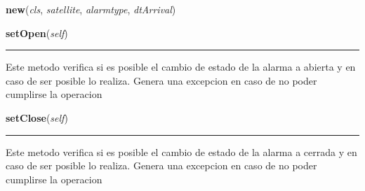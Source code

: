     \label{GroundSegment:models:Alarms:Alarm:Alarm:new}

    \vspace{0.5ex}

\hspace{.8\funcindent}\begin{boxedminipage}{\funcwidth}

    \raggedright \textbf{new}(\textit{cls}, \textit{satellite}, \textit{alarmtype}, \textit{dtArrival})

\setlength{\parskip}{2ex}
\setlength{\parskip}{1ex}
    \end{boxedminipage}

    \label{GroundSegment:models:Alarms:Alarm:Alarm:setOpen}

    \vspace{0.5ex}

\hspace{.8\funcindent}\begin{boxedminipage}{\funcwidth}

    \raggedright \textbf{setOpen}(\textit{self})

    \vspace{-1.5ex}

    \rule{\textwidth}{0.5\fboxrule}
\setlength{\parskip}{2ex}
    Este metodo verifica si es posible el cambio de estado de la alarma a 
    abierta y en caso de ser posible lo realiza. Genera una excepcion en 
    caso de no poder cumplirse la operacion

\setlength{\parskip}{1ex}
    \end{boxedminipage}

    \label{GroundSegment:models:Alarms:Alarm:Alarm:setClose}

    \vspace{0.5ex}

\hspace{.8\funcindent}\begin{boxedminipage}{\funcwidth}

    \raggedright \textbf{setClose}(\textit{self})

    \vspace{-1.5ex}

    \rule{\textwidth}{0.5\fboxrule}
\setlength{\parskip}{2ex}
    Este metodo verifica si es posible el cambio de estado de la alarma a 
    cerrada y en caso de ser posible lo realiza. Genera una excepcion en 
    caso de no poder cumplirse la operacion

\setlength{\parskip}{1ex}
    \end{boxedminipage}

